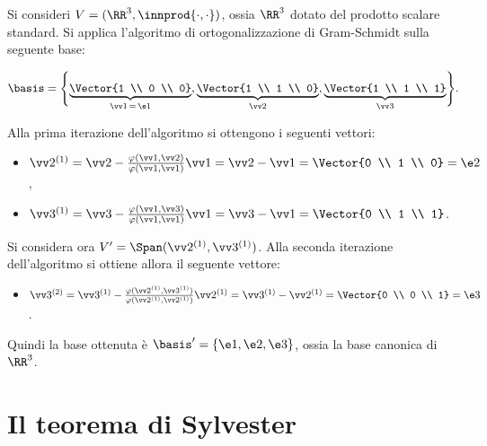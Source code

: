 \begin{example}
	Si consideri $V = (\RR^3, \innprod{\cdot, \cdot})$, ossia $\RR^3$ dotato del prodotto scalare standard.
	Si applica l'algoritmo di ortogonalizzazione di Gram-Schmidt sulla seguente base:
	
	\[ \basis = \Biggl\{ \underbrace{\Vector{1 \\ 0 \\ 0}}_{\vv 1 \, = \, \e1}, \underbrace{\Vector{1 \\ 1 \\ 0}}_{\vv 2}, \underbrace{\Vector{1 \\ 1 \\ 1}}_{\vv 3} \Biggl\}. \]
	
	\vskip 0.05in
	
	Alla prima iterazione dell'algoritmo si ottengono i seguenti vettori:
	
	\begin{itemize}
		\item $\vv 2 ^{(1)} = \vv 2 -  \frac{\varphi(\vv 1, \vv 2)}{\varphi(\vv 1, \vv 1)} \vv 1 = \vv 2 - \vv 1 = \Vector{0 \\ 1 \\ 0} = \e 2$,
		\item $\vv 3 ^{(1)} = \vv 3 - \frac{\varphi(\vv 1, \vv 3)}{\varphi(\vv 1, \vv 1)} \vv 1 = \vv 3 - \vv 1 = \Vector{0 \\ 1 \\ 1}$.
	\end{itemize}
	
	Si considera ora $V' = \Span(\vv 2 ^{(1)}, \vv 3 ^{(1)})$. Alla seconda iterazione dell'algoritmo si
	ottiene allora il seguente vettore:
	
	\begin{itemize}
		\item $\vv 3 ^{(2)} = \vv 3 ^{(1)} - \frac{\varphi(\vv 2 ^{(1)},  \vv 3 ^{(1)})}{\varphi(\vv 2 ^{(1)}, \vv 2 ^{(1)})} \vv 2 ^{(1)} = \vv 3 ^{(1)} - \vv 2 ^{(1)} = \Vector{0 \\ 0 \\ 1} = \e 3$.
	\end{itemize}
	
	Quindi la base ottenuta è $\basis' = \{\e1, \e2, \e3\}$, ossia la base canonica di $\RR^3$.
\end{example}

\section{Il teorema di Sylvester}

